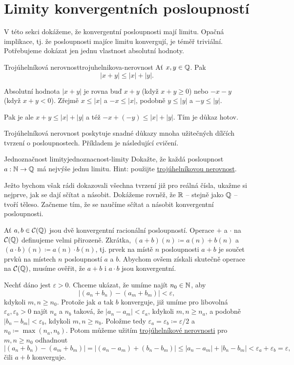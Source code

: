\section{Limity konvergentních posloupností}
\label{sec:limity-konvergentnich-posloupnosti}

V této sekci dokážeme, že konvergentní posloupnosti mají limitu. Opačná
implikace, tj. že posloupnosti majíce limitu konvergují, je téměř triviální.
Potřebujeme dokázat jen jednu vlastnost absolutní hodnoty.

\begin{lemma}{Trojúhelníková nerovnost}{trojuhelnikova-nerovnost}
 Ať $x,y \in \mathbb{Q}$. Pak
 \[
  |x + y| \leq |x| + |y|.
 \]
\end{lemma}
\begin{lemproof}
 Absolutní hodnota $|x+y|$ je rovna buď $x + y$ (když $x+y \geq 0$) nebo $-x-y$
 (když $x+y<0$). Zřejmě $x \leq |x|$ a $-x \leq |x|$, podobně $y \leq |y|$ a
 $-y \leq |y|$.

 Pak je ale $x + y \leq |x| + |y|$ a též $-x+(-y) \leq |x| + |y|$. Tím je důkaz
 hotov.
\end{lemproof}

Trojúhelníková nerovnost poskytuje snadné důkazy mnoha užitečných dílčích
tvrzení o posloupnostech. Příkladem je následující cvičení.

\begin{exercise}{Jednoznačnost limity}{jednoznacnost-limity}
 Dokažte, že každá posloupnost $a:\mathbb{N} \to \mathbb{Q}$ má nejvýše jednu limitu. Hint:
 použijte \hyperref[lem:trojuhelnikova-nerovnost]{trojúhelníkovou nerovnost}.
\end{exercise}

Ježto bychom však rádi dokazovali všechna tvrzení již pro reálná čísla, ukažme
si nejprve, jak se dají sčítat a násobit. Dokážeme rovněž, že $\mathbb{R}$ -- stejně
jako $\mathbb{Q}$ -- tvoří těleso. Začneme tím, že se naučíme sčítat a násobit
konvergentní posloupnosti.

Ať $a,b \in \mathcal{C}(\mathbb{Q})$ jsou dvě konvergentní racionální posloupností.
Operace $+$ a $ \cdot $ na $\mathcal{C}(\mathbb{Q})$ definujeme velmi přirozeně.
Zkrátka, $(a+b)(n) \coloneqq a(n) + b(n)$ a $(a \cdot b)(n) \coloneqq a(n) \cdot
b(n)$, tj. prvek na místě $n$ posloupnosti $a+b$ je součet prvků na místech $n$
posloupností $a$ a $b$. Abychom ovšem získali skutečně operace na
$\mathcal{C}(\mathbb{Q})$, musíme ověřit, že $a+b$ i $a \cdot b$ jsou konvergentní.

Nechť dáno jest $\varepsilon>0$. Chceme ukázat, že umíme najít $n_0 \in \mathbb{N}$, aby
\[
 |(a_n + b_n) - (a_m + b_m)| < \varepsilon,
\]
kdykoli $m,n \geq n_0$. Protože jak $a$ tak $b$ konverguje, již umíme pro
libovolná $\varepsilon_a,\varepsilon_b>0$ najít $n_a$ a $n_b$ taková, že $|a_n -
a_m| < \varepsilon_a$, kdykoli $m,n \geq n_a$, a podobně $|b_n -
b_m|<\varepsilon_b$, kdykoli $m,n \geq n_b$. Položme tedy $\varepsilon_a =
\varepsilon_b \coloneqq \varepsilon / 2$ a $n_0 \coloneqq \max(n_a,n_b)$. Potom
můžeme užitím \hyperref[lem:trojuhelnikova-nerovnost]{trojúhelníkové nerovnosti}
pro $m,n \geq n_0$ odhadnout
\[
 |(a_n + b_n) - (a_m + b_m)| = |(a_n - a_m) + (b_n - b_m)| \leq |a_n - a_m| +
 |b_n - b_m| < \varepsilon_a + \varepsilon_b = \varepsilon,
\]
čili $a + b$ konverguje.

